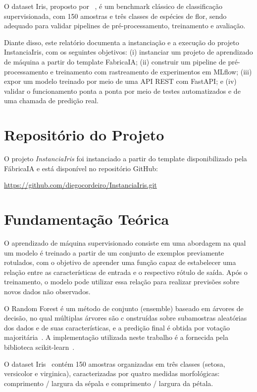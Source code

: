 \documentclass[12pt]{article}
\begin{document}
O dataset Iris, proposto por ~\cite{fisher1936iris}, é um benchmark clássico de classificação supervisionada, com 150
amostras e três classes de espécies de flor, sendo adequado para validar pipelines de pré-processamento,
treinamento e avaliação.

Diante disso, este relatório documenta a instanciação e a execução do projeto InstanciaIris, com os
seguintes objetivos: (i) instanciar um projeto de aprendizado de máquina a partir do template
FabricaIA; (ii) construir um pipeline de pré-processamento e treinamento com rastreamento de
experimentos em MLflow; (iii) expor um modelo treinado por meio de uma API REST com FastAPI; e
(iv) validar o funcionamento ponta a ponta por meio de testes automatizados e de uma chamada de
predição real.

\section{Repositório do Projeto}

O projeto \textit{InstanciaIris} foi instanciado a partir do template disponibilizado pela
FábricaIA e está disponível no repositório GitHub:

\begin{center}
\url{https://github.com/diegocordeiro/InstanciaIris.git}
\end{center}

\section{Fundamentação Teórica}
O aprendizado de máquina supervisionado consiste em uma abordagem na qual um modelo é 
treinado a partir de um conjunto de exemplos previamente rotulados, com o objetivo 
de aprender uma função capaz de estabelecer uma relação entre as características 
de entrada e o respectivo rótulo de saída. Após o treinamento, o modelo pode utilizar
 essa relação para realizar previsões sobre novos dados não observados. 
 
O Random Forest é um método de conjunto (ensemble) baseado em árvores de decisão, no qual múltiplas árvores são c
onstruídas sobre subamostras aleatórias dos
dados e de suas características, e a predição final é obtida por votação 
majoritária~\cite{breiman2001randomforests, dietterich2000ensemble}.
A implementação utilizada neste trabalho é a fornecida pela biblioteca scikit-learn~\cite{pedregosa2011sklearn}.

O dataset Iris~\cite{fisher1936iris} contém 150 amostras organizadas em três classes (setosa, versicolor
e virginica), caracterizadas por quatro medidas morfológicas: comprimento / largura da sépala e
comprimento / largura da pétala.
\end{document}
